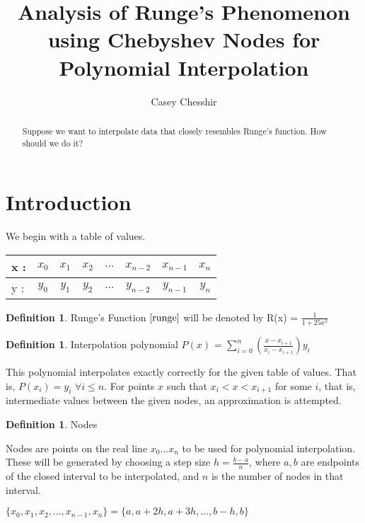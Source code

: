 \documentclass[]{article}
\title{Analysis of Runge's Phenomenon using Chebyshev Nodes for Polynomial Interpolation}
\author{Casey Chesshir}
\theoremstyle{plain}
\theoremstyle{definition}
\newtheorem{definition}[theorem]{Definition}
\begin{document}
\maketitle

\begin{abstract}
Suppose we want to interpolate data that closely resembles Runge's function. How should we do it? 
\end{abstract}

\section{Introduction}

We begin with a table of values.

\begin{tabular}{l*{6}{c}r}
x : & $x_0$ & $x_1$ & $x_2$ & $...$ & $x_{n-2}$  & $x_{n-1}$ & $x_n$ \\
\hline
y : & $y_0$ & $y_1$ & $y_2$ & $...$ & $y_{n-2}$  & $y_{n-1}$ & $y_n$ \\
\end{tabular}

\begin{definition}
Runge's Function $\cite{runge}$ will be denoted by R(x) = $\frac{1}{1+25x^2}$ 
\end{definition}


\begin{definition}
Interpolation polynomial $P(x)$ = $\sum_{i=0}^{n} (\frac{x-x_{i+1}}{x_i - x_{i+1}})y_i$

This polynomial interpolates exactly correctly for the given table of values. That is, $P(x_i) = y_i$ $\forall i \leq n$. For points $x$ such that $x_i < x < x_{i+1}$ for some $i$, that is, intermediate values between the given nodes, an approximation is attempted. 

\end{definition}

\begin{definition}
Nodes 

Nodes are points on the real line $x_0 ... x_n$ to be used for polynomial interpolation. These will be generated by choosing a step size $h = \frac{b-a}{n}$, where $a,b$ are endpoints of the closed interval to be interpolated, and $n$ is the number of nodes in that interval.  

$\{x_0, x_1, x_2, ..., x_{n-1}, x_n\} = \{a, a+2h, a+3h, ..., b - h, b\}$
\end{definition}
\end{document}
